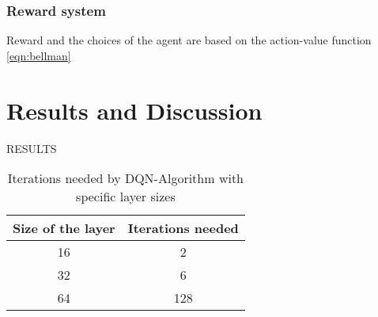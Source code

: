 \documentclass{article}
\begin{document}
\subsubsection{Reward system}
Reward and the choices of the agent are based on the action-value function \ref{eqn:bellman}

\newpage
\section*{Results and Discussion}
RESULTS

\begin{table}[h]
\caption{Iterations needed by DQN-Algorithm with specific layer sizes}
\centering
\begin{tabular}{cc}
  \hline
  \textbf{Size of the layer} & \textbf{Iterations needed} \\
  \hline
  16 & 2 \\
  32 & 6 \\
  64 & 128 \\
  \hline
\end{tabular}
\label{tab:table1}
\end{table}
\end{document}
